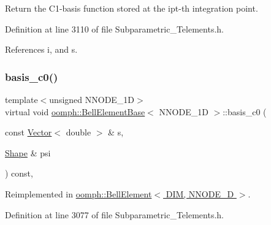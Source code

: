 Return the C1-\/basis function stored at the ipt-\/th integration point. 



Definition at line 3110 of file Subparametric\+\_\+\+Telements.\+h.



References i, and s.

\mbox{\label{classoomph_1_1BellElementBase_a2c9a75b9d07c0aa569ba24d2b3228800}} 
\subsubsection{\texorpdfstring{basis\+\_\+c0()}{basis\_c0()}}
{\footnotesize\ttfamily template$<$unsigned N\+N\+O\+D\+E\+\_\+1D$>$ \\
virtual void \hyperlink{classoomph_1_1BellElementBase}{oomph\+::\+Bell\+Element\+Base}$<$ N\+N\+O\+D\+E\+\_\+1D $>$\+::basis\+\_\+c0 (\begin{DoxyParamCaption}\item[{const \hyperlink{classoomph_1_1Vector}{Vector}$<$ double $>$ \&}]{s,  }\item[{\hyperlink{classoomph_1_1Shape}{Shape} \&}]{psi }\end{DoxyParamCaption}) const\hspace{0.3cm}{\ttfamily [inline]}, {\ttfamily [virtual]}}



Reimplemented in \hyperlink{classoomph_1_1BellElement_ad99554f0767e1d82e371ebce2219521b}{oomph\+::\+Bell\+Element$<$ D\+I\+M, N\+N\+O\+D\+E\+\_\+D $>$}.



Definition at line 3077 of file Subparametric\+\_\+\+Telements.\+h.

\mbox{\label{classoomph_1_1BellElementBase_a0952ed8fcba04688fdf895dc25bb8c30}} 
